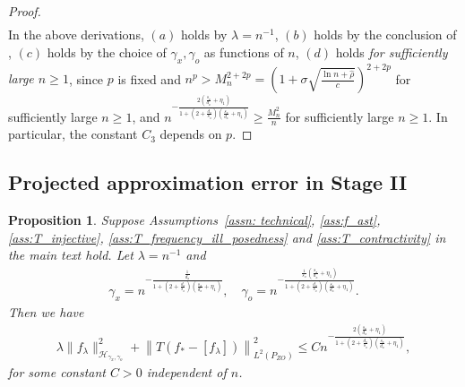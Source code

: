 \documentclass[11pt]{article}
\newcommand{\calH}{\mathcal{H}}
\newcommand{\0}{\mathbf{0}}
\newtheorem{prop}{Proposition}[section]
\begin{document}
\begin{appendix}
\begin{proof}
\begin{align*}
    \end{align*}
    In the above derivations, $(a)$ holds by $\lambda=n^{-1}$, $(b)$ holds by the conclusion of , $(c)$ holds by the choice of $\gamma_x,\gamma_o$ as functions of $n$, $(d)$ holds \emph{for sufficiently large $n\geq 1$}, since $p$ is fixed and $n^{p} > M_n^{2+2p} = \left(1 + \sigma\sqrt{\frac{\ln n + \hat{\rho}}{c}}\right)^{2+2p}$ for sufficiently large $n\geq 1$, and $n^{-\frac{2(\frac{s_x}{d_x}+\eta_1)}{1+(2+\frac{d_o}{s_o})(\frac{s_x}{d_x}+\eta_1)}} \geq \frac{M_n^2}{n}$ for sufficiently large $n\geq 1$. In particular, the constant $C_3$ depends on $p$. 
\end{proof}


\subsection{Projected approximation error in Stage II}
\label{sec:approx_main}
\begin{prop}
\label{prop: approx_error}
Suppose Assumptions~\ref{assn: technical}, \ref{ass:f_ast}, \ref{ass:T_injective}, \ref{ass:T_frequency_ill_posedness} and \ref{ass:T_contractivity} in the main text hold. 
Let $\lambda = n^{-1}$ and 
\begin{align*}
    \gamma_x = n^{-\frac{\frac{1}{d_x}}{1+(2+\frac{d_o}{s_o})(\frac{s_x}{d_x}+\eta_1)}}, \quad \gamma_o = n^{-\frac{\frac{1}{s_o}(\frac{s_x}{d_x}+\eta_1)}{1+(2+\frac{d_o}{s_o})(\frac{s_x}{d_x}+\eta_1)}}. 
\end{align*} Then we have 
\begin{align*}
    \lambda \| f_\lambda\|_{\calH_{\gamma_x,\gamma_o}}^2 + \left\|T\left(f_{\ast} - \left[f_{\lambda}\right]\right)\right\|_{L^2(P_{ZO})}^2 \leq C n^{-\frac{2(\frac{s_x}{d_x}+\eta_1)}{1+(2+\frac{d_o}{s_o})(\frac{s_x}{d_x}+\eta_1)}},
\end{align*}
for some constant $C>0$ independent of $n$. 
\end{prop}


\end{appendix}
\end{document}
